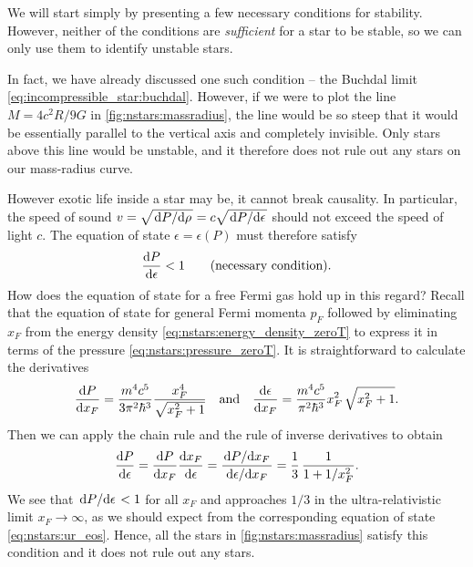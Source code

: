We will start simply by presenting a few necessary conditions for stability.
However, neither of the conditions are \emph{sufficient} for a star to be stable, so we can only use them to identify unstable stars.

In fact, we have already discussed one such condition -- the Buchdal limit \eqref{eq:incompressible_star:buchdal}.
However, if we were to plot the line $M = 4 c^2 R / 9 G$ in \cref{fig:nstars:massradius}, the line would be so steep that it would be essentially parallel to the vertical axis and completely invisible.
Only stars above this line would be unstable, and it therefore does not rule out any stars on our mass-radius curve.

However exotic life inside a star may be, it cannot break causality. 
In particular, the speed of sound $v = \sqrt{\odv{P}/{\rho}} = c \sqrt{\odv{P}/{\epsilon}}$ should not exceed the speed of light $c$.
The equation of state $\epsilon = \epsilon(P)$ must therefore satisfy
\begin{equation}
	\odv{P}{\epsilon} < 1
	\qquad \text{(necessary condition)} .
\end{equation}
How does the equation of state for a free Fermi gas hold up in this regard?
Recall that the equation of state for general Fermi momenta $p_F$ followed by eliminating $x_F$ from the energy density \eqref{eq:nstars:energy_density_zeroT} to express it in terms of the pressure \eqref{eq:nstars:pressure_zeroT}.
It is straightforward to calculate the derivatives
\begin{equation}
	\odv{P}{x_F} = \frac{m^4 c^5}{3 \pi^2 \hbar^3} \frac{x_F^4}{\sqrt{x_F^2 + 1}}
	\quad \text{and} \quad
	\odv{\epsilon}{x_F} = \frac{m^4 c^5}{\pi^2 \hbar^3} x_F^2 \, \sqrt{x_F^2 + 1} .
\end{equation}
Then we can apply the chain rule and the rule of inverse derivatives to obtain
\begin{equation}
	\odv{P}{\epsilon} = 
	\odv{P}{x_F} \odv{x_F}{\epsilon} =
	\frac{\odv{P}/{x_F}}{\odv{\epsilon}/{x_F}} =
	\frac13 \, \frac{1}{1+1/x_F^2}.
\label{eq:nstars:dPde}
\end{equation}
We see that $\odv{P}/{\epsilon} < 1$ for all $x_F$ and approaches $1/3$ in the ultra-relativistic limit $x_F \rightarrow \infty$, as we should expect from the corresponding equation of state \eqref{eq:nstars:ur_eos}.
Hence, all the stars in \cref{fig:nstars:massradius} satisfy this condition and it does not rule out any stars.

